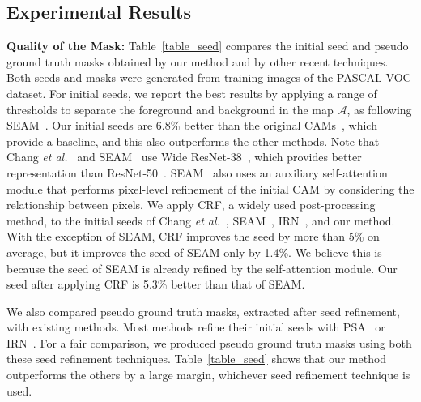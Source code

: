 \documentclass[final]{cvpr}
\begin{document}
\vspace{-0.2em}
\subsection{Experimental Results}
\vspace{-0.2em}
{\textbf{Quality of the Mask:}} 
Table~\ref{table_seed} compares the initial seed and pseudo ground truth masks obtained by our method and by other recent techniques. Both seeds and masks were generated from training images of the PASCAL VOC dataset. 
For initial seeds, we report the best results by applying a range of thresholds to separate the foreground and background in the map $\mathcal{A}$, as following SEAM~\cite{wang2020self}.
Our initial seeds are 6.8\% better than the original CAMs~\cite{zhou2016learning}, which provide a baseline, and this also outperforms the other methods.
Note that Chang \textit{et al.}~\cite{chang2020weakly} and SEAM~\cite{wang2020self} use Wide ResNet-38~\cite{wu2019wider}, which provides better representation than ResNet-50~\cite{he2016deep}. SEAM~\cite{wang2020self} also uses an auxiliary self-attention module that performs pixel-level refinement of the initial CAM by considering the relationship between pixels. 
We apply CRF, a widely used post-processing method, to the initial seeds of Chang \textit{et al.}~\cite{chang2020weakly}, SEAM~\cite{wang2020self}, IRN~\cite{ahn2019weakly}, and our method.
With the exception of SEAM, CRF improves the seed by more than 5\% on average, but it improves the seed of SEAM only by 1.4\%.
We believe this is because the seed of SEAM is already refined by the self-attention module. Our seed after applying CRF is 5.3\% better than that of SEAM.


We also compared pseudo ground truth masks, extracted after seed refinement, with existing methods.
Most methods refine their initial seeds with PSA~\cite{ahn2018learning} or IRN~\cite{ahn2019weakly}.
For a fair comparison, we produced pseudo ground truth masks using both these seed refinement techniques. 
Table~\ref{table_seed} shows that our method outperforms the others by a large margin, whichever seed refinement technique is used.
\end{document}
